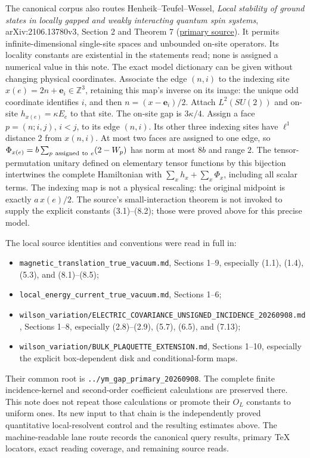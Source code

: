 \documentclass[
]{article}
\providecommand{\tightlist}{%
  \setlength{\itemsep}{0pt}\setlength{\parskip}{0pt}}
\begin{document}
The canonical corpus also routes Henheik--Teufel--Wessel, \emph{Local
stability of ground states in locally gapped and weakly interacting
quantum spin systems}, arXiv:2106.13780v3, Section 2 and Theorem 7
(\href{https://arxiv.org/abs/2106.13780}{primary source}). It permits
infinite-dimensional single-site spaces and unbounded on-site operators.
Its locality constants are existential in the statements read; none is
assigned a numerical value in this note. The exact model dictionary can
be given without changing physical coordinates. Associate the edge
\((n,i)\) to the indexing site \(x(e)=2n+\mathbf e_i\in\mathbb Z^3\),
retaining this map's inverse on its image: the unique odd coordinate
identifies \(i\), and then \(n=(x-\mathbf e_i)/2\). Attach
\(L^2(SU(2))\) and on-site \(h_{x(e)}=\kappa E_e\) to that site. The
on-site gap is \(3\kappa/4\). Assign a face \(p=(n;i,j)\), \(i<j\), to
its edge \((n,i)\). Its other three indexing sites have \(\ell^1\)
distance \(2\) from \(x(n,i)\). At most two faces are assigned to one
edge, so \(\Phi_{x(e)}=b\sum_{p\ {\rm assigned\ to}\ e}(2-W_p)\) has
norm at most \(8b\) and range \(2\). The tensor-permutation unitary
defined on elementary tensor functions by this bijection intertwines the
complete Hamiltonian with \(\sum_xh_x+\sum_x\Phi_x\), including all
scalar terms. The indexing map is not a physical rescaling: the original
midpoint is exactly \(a\,x(e)/2\). The source's small-interaction
theorem is not invoked to supply the explicit constants (3.1)--(8.2);
those were proved above for this precise model.

The local source identities and conventions were read in full in:

\begin{itemize}
\tightlist
\item
  \texttt{magnetic\_translation\_true\_vacuum.md}, Sections 1--9,
  especially (1.1), (1.4), (5.3), and (8.1)--(8.5);
\item
  \texttt{local\_energy\_current\_true\_vacuum.md}, Sections 1--6;
\item
  \texttt{wilson\_variation/ELECTRIC\_COVARIANCE\_UNSIGNED\_INCIDENCE\_20260908.md},
  Sections 1--8, especially (2.8)--(2.9), (5.7), (6.5), and (7.13);
\item
  \texttt{wilson\_variation/BULK\_PLAQUETTE\_EXTENSION.md}, Sections
  1--10, especially the explicit box-dependent disk and conditional-form
  maps.
\end{itemize}

Their common root is \texttt{../ym\_gap\_primary\_20260908}. The
complete finite incidence-kernel and second-order coefficient
calculations are preserved there. This note does not repeat those
calculations or promote their \(O_L\) constants to uniform ones. Its new
input to that chain is the independently proved quantitative
local-resolvent control and the resulting estimates above. The
machine-readable lane route records the canonical query results, primary
TeX locators, exact reading coverage, and remaining source reads.
\end{document}
